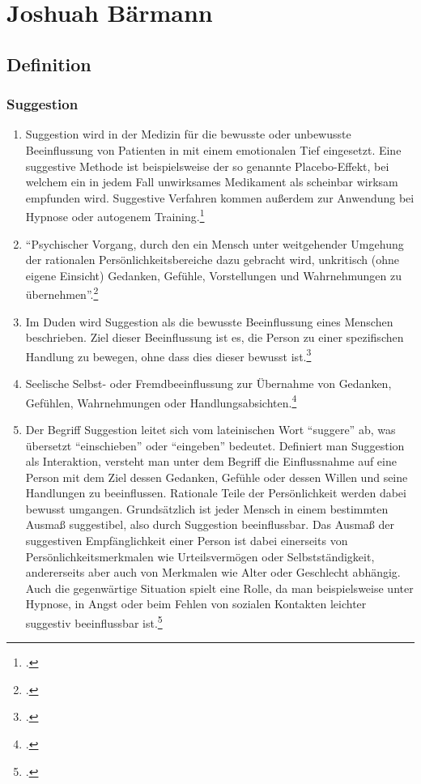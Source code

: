 \chapter{Joshuah Bärmann}
\label{sec:Joshuah_Baermann}

\section{Definition}

\subsection{Suggestion}
\begin{enumerate}
	\item Suggestion wird in der Medizin für die bewusste oder unbewusste Beeinflussung von Patienten
in mit einem emotionalen Tief eingesetzt. Eine suggestive Methode ist beispielsweise der so genannte
Placebo-Effekt, bei welchem ein in jedem Fall unwirksames Medikament als scheinbar wirksam empfunden
wird. Suggestive Verfahren kommen außerdem zur Anwendung bei Hypnose oder autogenem
Training.\footcite[145]{Frank_Neurologie_und_Psychiatrie}

	\item \enquote{Psychischer Vorgang, durch den ein Mensch unter weitgehender Umgehung der rationalen
Persönlichkeitsbereiche dazu gebracht wird, unkritisch (ohne eigene Einsicht) Gedanken, Gefühle,
Vorstellungen und Wahrnehmungen zu übernehmen}.\footcite[514]{Peters_Woerterbuch_der_Psychiatrie}

	\item Im Duden wird Suggestion als die bewusste Beeinflussung eines Menschen beschrieben. Ziel
dieser Beeinflussung ist es, die Person zu einer spezifischen Handlung zu bewegen, ohne dass dies
dieser bewusst ist.\footcite[782]{Duden:Fremdwoerterbuch}

	\item Seelische Selbst- oder Fremdbeeinflussung zur Übernahme von Gedanken, Gefühlen,
Wahrnehmungen oder
Handlungsabsichten.\footcite[217]{Enzyklopaedie_elektrophysiologischer_Untersuchungen}

	\item Der Begriff Suggestion leitet sich vom lateinischen Wort \enquote{suggere} ab, was übersetzt
\enquote{einschieben} oder \enquote{eingeben} bedeutet. Definiert man Suggestion als Interaktion, versteht man unter
dem Begriff die Einflussnahme auf eine Person mit dem Ziel dessen Gedanken, Gefühle oder dessen
Willen und seine Handlungen zu beeinflussen. Rationale Teile der Persönlichkeit werden dabei bewusst
umgangen. Grundsätzlich ist jeder Mensch in einem bestimmten Ausmaß suggestibel, also durch
Suggestion beeinflussbar. Das Ausmaß der suggestiven Empfänglichkeit einer Person ist dabei
einerseits von Persönlichkeitsmerkmalen wie Urteilsvermögen oder Selbstständigkeit, andererseits aber
auch von Merkmalen wie Alter oder Geschlecht abhängig. Auch die gegenwärtige Situation spielt eine
Rolle, da man beispielsweise unter Hypnose, in Angst oder beim Fehlen von sozialen Kontakten leichter
suggestiv beeinflussbar ist.\footcite[848]{Psychologisches_Woerterbuch}
\end{enumerate}

